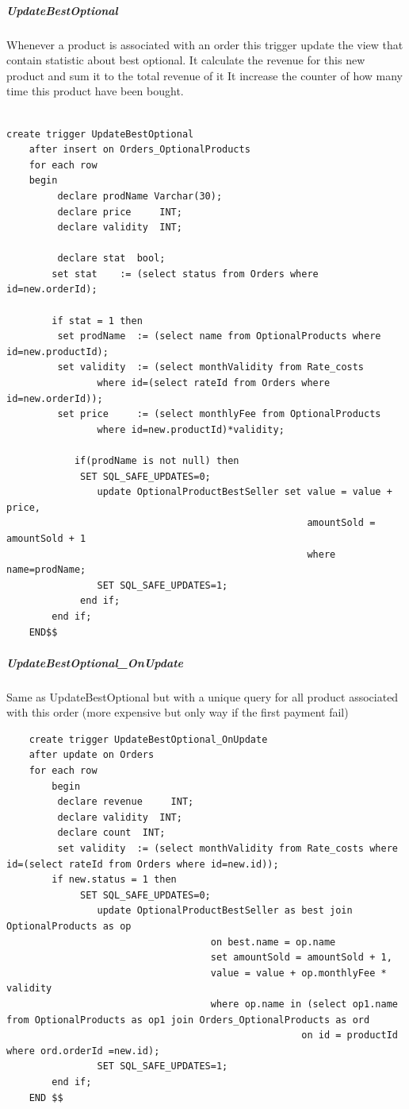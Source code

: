 \documentclass{article}
\begin{document}
\subparagraph{UpdateBestOptional}
Whenever a product is associated with an order this trigger update the view that contain statistic about best optional.
It calculate the revenue for this new product and sum it to the total revenue of it
It increase the counter of how many time this product have been bought.
\begin{lstlisting}
    
create trigger UpdateBestOptional
    after insert on Orders_OptionalProducts
	for each row
    begin
		 declare prodName Varchar(30);
         declare price     INT;
         declare validity  INT;
         
         declare stat  bool;
		set stat    := (select status from Orders where id=new.orderId);

		if stat = 1 then
		 set prodName  := (select name from OptionalProducts where id=new.productId);
         set validity  := (select monthValidity from Rate_costs 
         		where id=(select rateId from Orders where id=new.orderId));
		 set price     := (select monthlyFee from OptionalProducts 
		 		where id=new.productId)*validity;
         
			if(prodName is not null) then
			 SET SQL_SAFE_UPDATES=0;    
				update OptionalProductBestSeller set value = value + price,
													 amountSold = amountSold + 1 
													 where name=prodName;
				SET SQL_SAFE_UPDATES=1;    
			 end if;
        end if;
    END$$
\end{lstlisting}

\subparagraph{UpdateBestOptional_OnUpdate}
Same as UpdateBestOptional but with a unique query for all product associated with this order (more expensive but only way if the first payment fail)
\begin{lstlisting}
    create trigger UpdateBestOptional_OnUpdate
	after update on Orders
    for each row
		begin
         declare revenue     INT;
         declare validity  INT;
		 declare count  INT;
		 set validity  := (select monthValidity from Rate_costs where id=(select rateId from Orders where id=new.id));
		if new.status = 1 then
			 SET SQL_SAFE_UPDATES=0;    
				update OptionalProductBestSeller as best join OptionalProducts as op
									on best.name = op.name
									set amountSold = amountSold + 1,
									value = value + op.monthlyFee * validity
									where op.name in (select op1.name from OptionalProducts as op1 join Orders_OptionalProducts as ord
													on id = productId where ord.orderId =new.id);
				SET SQL_SAFE_UPDATES=1;    
		end if;
	END $$
\end{lstlisting}
\end{document}
